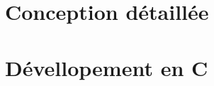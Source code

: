 \documentclass[french]{extarticle}
\begin{document}
\newpage
\section{Conception détaillée}
	
	
	
	
	
	
	
	
	

\newpage
\section{Dévellopement en C}

\end{document}
